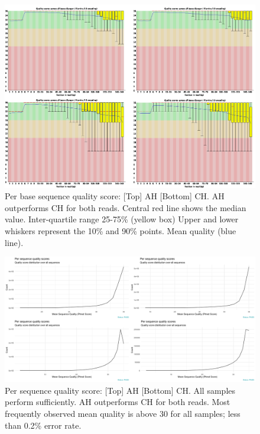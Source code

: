 \documentclass{article}
\begin{document}
\begin{figure}[h] \hspace*{0cm} 
\begin{center}
    \includegraphics[scale=0.3]{fastqc/p1}
	\caption{Per base sequence quality score: [Top] AH [Bottom] CH. AH outperforms CH for both reads.
		Central red line shows the median value.
	Inter-quartile range 25-75\% (yellow box)
	Upper and lower whiskers represent the 10\% and 90\% points.
	Mean quality (blue line).
	}
	\label{fig:p1}
\end{center}
\end{figure}

\begin{figure}[h] \hspace*{0cm} 
\begin{center}
    \includegraphics[scale=0.25]{fastqcr/p2}
	\caption{Per sequence quality score: [Top] AH [Bottom] CH. All samples perform sufficiently.  AH outperforms CH for both reads.
	Most frequently observed mean quality is above 30 for all samples; less than 0.2\% error rate.
	}
	\label{fig:p2}
\end{center}
\end{figure}
\end{document}
